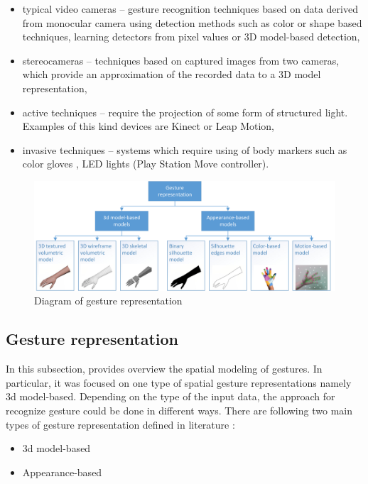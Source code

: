 \begin{itemize}

\item typical video cameras -- gesture recognition techniques based on data derived from monocular camera using detection methods such as color or shape based techniques, learning detectors from pixel values or 3D model-based detection,

\item stereocameras -- techniques based on captured images from two cameras, which provide an approximation of the recorded data to a 3D model representation,

\item active techniques -- require the projection of some form of structured light. Examples of this kind devices are Kinect or Leap Motion,

\item invasive techniques -- systems which require using of body markers such as color gloves \cite{Wang:2009:RHC:1531326.1531369}, LED lights (Play Station Move controller).

\end{itemize}

\begin{figure}[htb]
\centering
 \includegraphics[width=1\columnwidth]{figures/gestureRepresentations.png}
 \caption[]{Diagram of gesture representation}
 \label{gesturerepresentations}
\end{figure}

\subsection{Gesture representation}
In this subsection, provides overview the spatial modeling of gestures. In particular, it was focused on one type of spatial gesture representations namely 3d model-based.
Depending on the type of the input data, the approach for recognize gesture could be done in different ways.
There are following two main types of gesture representation defined in literature \cite{Huang95handgesture}\cite{Pavlovic97visualinterpretation}:
\begin{itemize}
\item 3d model-based
\item Appearance-based
\end{itemize}

